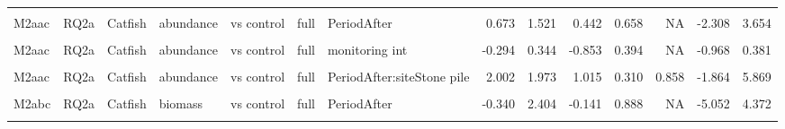 \documentclass[
  12pt,
  a4paper,
  oneside]{scrbook}
\begin{document}
\begin{landscape}
\begin{longtable}[t]{lllllllrrrrrrr}
\cellcolor{gray!8}{M2aac} & \cellcolor{gray!8}{RQ2a} & \cellcolor{gray!8}{Catfish} & \cellcolor{gray!8}{abundance} & \cellcolor{gray!8}{vs control} & \cellcolor{gray!8}{full} & \cellcolor{gray!8}{(Intercept)} & \cellcolor{gray!8}{-3.976} & \cellcolor{gray!8}{1.631} & \cellcolor{gray!8}{-2.438} & \cellcolor{gray!8}{0.015} & \cellcolor{gray!8}{NA} & \cellcolor{gray!8}{-7.173} & \cellcolor{gray!8}{-0.780}\\
M2aac & RQ2a & Catfish & abundance & vs control & full & PeriodAfter & 0.673 & 1.521 & 0.442 & 0.658 & NA & -2.308 & 3.654\\
\addlinespace
\cellcolor{gray!8}{M2aac} & \cellcolor{gray!8}{RQ2a} & \cellcolor{gray!8}{Catfish} & \cellcolor{gray!8}{abundance} & \cellcolor{gray!8}{vs control} & \cellcolor{gray!8}{full} & \cellcolor{gray!8}{siteStone pile} & \cellcolor{gray!8}{-0.639} & \cellcolor{gray!8}{1.762} & \cellcolor{gray!8}{-0.362} & \cellcolor{gray!8}{0.717} & \cellcolor{gray!8}{NA} & \cellcolor{gray!8}{-4.093} & \cellcolor{gray!8}{2.816}\\
M2aac & RQ2a & Catfish & abundance & vs control & full & monitoring int & -0.294 & 0.344 & -0.853 & 0.394 & NA & -0.968 & 0.381\\
\cellcolor{gray!8}{M2aac} & \cellcolor{gray!8}{RQ2a} & \cellcolor{gray!8}{Catfish} & \cellcolor{gray!8}{abundance} & \cellcolor{gray!8}{vs control} & \cellcolor{gray!8}{full} & \cellcolor{gray!8}{fetch z} & \cellcolor{gray!8}{-1.194} & \cellcolor{gray!8}{1.077} & \cellcolor{gray!8}{-1.109} & \cellcolor{gray!8}{0.267} & \cellcolor{gray!8}{NA} & \cellcolor{gray!8}{-3.305} & \cellcolor{gray!8}{0.916}\\
M2aac & RQ2a & Catfish & abundance & vs control & full & PeriodAfter:siteStone pile & 2.002 & 1.973 & 1.015 & 0.310 & 0.858 & -1.864 & 5.869\\
\cellcolor{gray!8}{M2abc} & \cellcolor{gray!8}{RQ2a} & \cellcolor{gray!8}{Catfish} & \cellcolor{gray!8}{biomass} & \cellcolor{gray!8}{vs control} & \cellcolor{gray!8}{full} & \cellcolor{gray!8}{(Intercept)} & \cellcolor{gray!8}{0.202} & \cellcolor{gray!8}{4.319} & \cellcolor{gray!8}{0.047} & \cellcolor{gray!8}{0.963} & \cellcolor{gray!8}{NA} & \cellcolor{gray!8}{-8.262} & \cellcolor{gray!8}{8.667}\\
\addlinespace
M2abc & RQ2a & Catfish & biomass & vs control & full & PeriodAfter & -0.340 & 2.404 & -0.141 & 0.888 & NA & -5.052 & 4.372\\
\cellcolor{gray!8}{M2abc} & \cellcolor{gray!8}{RQ2a} & \cellcolor{gray!8}{Catfish} & \cellcolor{gray!8}{biomass} & \cellcolor{gray!8}{vs control} & \cellcolor{gray!8}{full} & \cellcolor{gray!8}{siteStone pile} & \cellcolor{gray!8}{-5.574} & \cellcolor{gray!8}{7.158} & \cellcolor{gray!8}{-0.779} & \cellcolor{gray!8}{0.436} & \cellcolor{gray!8}{NA} & \cellcolor{gray!8}{-19.604} & \cellcolor{gray!8}{8.456}\\

\end{longtable}
\end{landscape}
\end{document}
